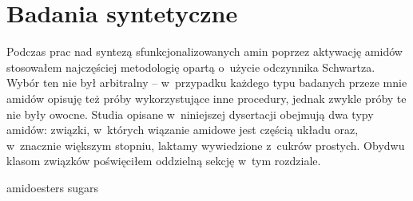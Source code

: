 \chapter{Badania syntetyczne}\label{chapter:synthesis}

Podczas prac nad syntezą sfunkcjonalizowanych amin poprzez aktywację amidów
  stosowałem najczęściej metodologię opartą o~użycie odczynnika Schwartza.
Wybór ten nie był arbitralny \--- w~przypadku każdego typu badanych przeze mnie
  amidów opisuję też próby wykorzystujące inne procedury,
  jednak zwykle próby te nie były owocne.
Studia opisane w~niniejszej dysertacji obejmują dwa typy amidów:
  związki, w~których wiązanie amidowe jest częścią układu 
  oraz, w~znacznie większym stopniu, laktamy wywiedzione z~cukrów prostych.
Obydwu klasom związków poświęciłem oddzielną sekcję w~tym rozdziale.

{amidoesters}
{sugars}
